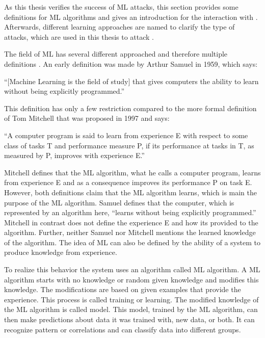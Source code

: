 As this thesis verifies the success of \acf{ML} attacks, this section provides some definitions for \ac{ML} algorithms and gives an introduction for the interaction with \pufs.
Afterwards, different learning approaches are named to clarify the type of attacks, which are used in this thesis to attack \pufs. %

The field of \ac{ML} has several different approached and therefore multiple definitions \cite{Wikipedia2017MachineLearning}.
An early definition was made by Arthur Samuel in 1959, which says:

``[Machine Learning is the field of study] that gives computers the ability to learn without being explicitly programmed.'' \cite{Samuel1959SomeCheckers}

This definition has only a few restriction compared to the more formal definition of Tom Mitchell that was proposed in 1997 and says:

``A computer program is said to learn from experience E with respect to some class of tasks T and performance measure P, if its performance at tasks in T, as measured by P, improves with experience E.'' \cite{Mitchell1997MachineLearning}

Mitchell defines that the \ac{ML} algorithm, what he calls a computer program, learns from experience E and as a consequence improves its performance P on task E. %
However, both definitions claim that the \ac{ML} algorithm learns, which is main the purpose of the \ac{ML} algorithm.
Samuel defines that the computer, which is represented by an algorithm here, ``learns without being explicitly programmed.''
Mitchell in contrast does not define the experience E and how its provided to the algorithm. %
Further, neither Samuel nor Mitchell mentions the learned knowledge of the algorithm.
The idea of \acf{ML} can also be defined by the ability of a system to produce knowledge from experience.

To realize this behavior the system uses an algorithm called \ac{ML} algorithm.
A \ac{ML} algorithm starts with no knowledge or random given knowledge and modifies this knowledge.
The modifications are based on given examples that provide the experience. 
This process is called training or learning. %
The modified knowledge of the \ac{ML} algorithm is called model.
This model, trained by the \ac{ML} algorithm, can then make predictions about data it was trained with, new data, or both.
It can recognize pattern or correlations and can classify data into different groups.


